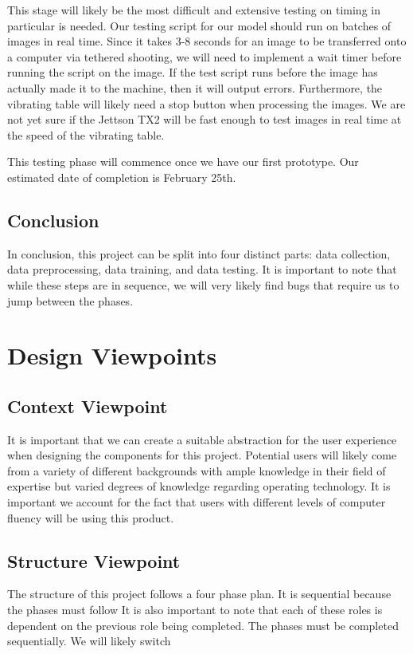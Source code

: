 \documentclass[onecolumn, draftclsnofoot,10pt, compsoc]{IEEEtran}
\begin{document}
This stage will likely be the most difficult and extensive testing on timing in particular is needed. Our testing script for our model should run on batches of images in real time. Since it takes 3-8 seconds for an image to be transferred onto a computer via tethered shooting, we will need to implement a wait timer before running the script on the image. If the test script runs before the image has actually made it to the machine, then it will output errors. Furthermore, the vibrating table will likely need a stop button when processing the images. We are not yet sure if the Jettson TX2 will be fast enough to test images in real time at the speed of the vibrating table. 

This testing phase will commence once we have our first prototype. Our estimated date of completion is February 25th. 

\subsection{Conclusion}

In conclusion, this project can be split into four distinct parts: data collection, data preprocessing, data training, and data testing. It is important to note that while these steps are in sequence, we will very likely find bugs that require us to jump between the phases. 

\section{Design Viewpoints}
\subsection{Context Viewpoint}
It is important that we can create a suitable abstraction for the user experience when designing the components for this project. Potential users will likely come from a variety of different backgrounds with ample knowledge in their field of expertise but varied degrees of knowledge regarding operating technology. It is important we account for the fact that users with different levels of computer fluency will be using this product.
\subsection{Structure Viewpoint}
The structure of this project follows a four phase plan. It is sequential because the phases must follow  It is also important to note that each of these roles is dependent on the previous role being completed. The phases must be completed sequentially. We will likely switch 
\end{document}
